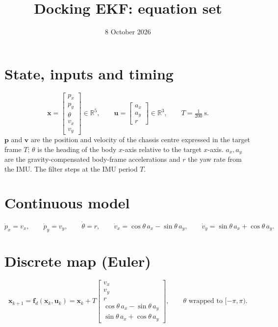 \documentclass[11pt,a4paper]{article}
\title{Docking EKF: equation set}
\author{}
\date{8 October 2026}
\newcommand{\vect}[1]{\bm{#1}}
\newcommand{\Real}{\mathbb{R}}
\begin{document}
\maketitle
\vspace{-2em}

\section{State, inputs and timing}
\begin{equation}
\vect x = \begin{bmatrix} p_x \\ p_y \\ \theta \\ v_x \\ v_y \end{bmatrix}\in\Real^5,
\qquad
\vect u = \begin{bmatrix} a_x \\ a_y \\ r \end{bmatrix}\in\Real^3,
\qquad
T = \tfrac{1}{200}\ \text{s}.
\end{equation}
$\vect p$ and $\vect v$ are the position and velocity of the chassis centre expressed in the target frame $T$; $\theta$ is the heading of the body $x$-axis relative to the target $x$-axis. $a_x,a_y$ are the gravity-compensated body-frame accelerations and $r$ the yaw rate from the IMU. The filter steps at the IMU period $T$.

\section{Continuous model}
\begin{equation}
\dot p_x = v_x,\qquad
\dot p_y = v_y,\qquad
\dot\theta = r,\qquad
\dot v_x = \cos\theta\,a_x - \sin\theta\,a_y,\qquad
\dot v_y = \sin\theta\,a_x + \cos\theta\,a_y.
\end{equation}

\section{Discrete map (Euler)}
\begin{equation}
\vect x_{k+1} = \vect f_d(\vect x_k,\vect u_k) = \vect x_k + T
\begin{bmatrix}
v_x \\ v_y \\ r \\ \cos\theta\,a_x - \sin\theta\,a_y \\ \sin\theta\,a_x + \cos\theta\,a_y
\end{bmatrix},
\qquad \theta \text{ wrapped to } [-\pi,\pi).
\end{equation}
\end{document}
